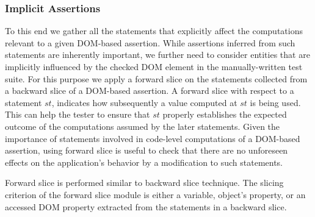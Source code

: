 \subsubsection{Implicit Assertions} \label{Sec:ImplicitAssertions}
To this end we gather all the statements that explicitly affect the computations relevant to a given DOM-based assertion. While assertions inferred from such statements are inherently important, we further need to consider entities that are implicitly influenced by the checked DOM element in the manually-written test suite. For this purpose we apply a forward slice on the statements collected from a backward slice of a DOM-based assertion. A forward slice with respect to a statement $st$,
indicates how subsequently a value computed at $st$ is being used. This can help the tester to ensure that $st$ properly establishes the expected outcome of the computations assumed by the later statements. 
Given the importance of statements involved in code-level computations of a DOM-based assertion, using forward slice is useful to check that there are no unforeseen effects on the application's behavior by a modification to such statements. 

Forward slice is performed similar to backward slice technique. The slicing criterion of the forward slice module is either a variable, object's property, or an accessed DOM property extracted from the statements in a backward slice.   